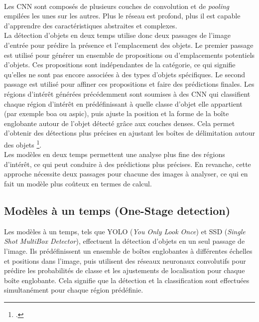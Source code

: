 \documentclass[12pt,twoside]{book}
\begin{document}
\paragraph{}Les CNN sont composés de plusieurs couches de convolution et de \textit{pooling} empilées les unes sur les autres. Plus le réseau est profond, plus il est capable d'apprendre des caractéristiques abstraites et complexes. \\

La détection d'objets en deux temps utilise donc deux passages de l'image d'entrée pour prédire la présence et l'emplacement des objets. Le premier passage est utilisé pour générer un ensemble de propositions ou d'emplacements potentiels d'objets. Ces propositions sont indépendantes de la catégorie, ce qui signifie qu'elles ne sont pas encore associées à des types d'objets spécifiques. Le second passage est utilisé pour affiner ces propositions et faire des prédictions finales. Les régions d'intérêt générées précédemment sont soumises à des CNN qui classifient chaque région d'intérêt en prédéfinissant à quelle classe d'objet elle appartient (par exemple boa ou aspic), puis ajuste la position et la forme de la boîte englobante autour de l'objet détecté grâce aux couches denses. Cela permet d'obtenir des détections plus précises en ajustant les boîtes de délimitation autour des objets \footcite[p. 2-3]{jiao_survey_2019}. \\

Les modèles en deux temps permettent une analyse plus fine des régions d'intérêt, ce qui peut conduire à des prédictions plus précises. En revanche, cette approche nécessite deux passages pour chacune des images à analyser, ce qui en fait un modèle plus coûteux en termes de calcul. 

\newpage

\subsection{Modèles à un temps (One-Stage detection)}

Les modèles à un temps, tels que YOLO (\textit{You Only Look Once}) et SSD (\textit{Single Shot MultiBox Detector}), effectuent la détection d'objets en un seul passage de l’image. Ils prédéfinissent un ensemble de boîtes englobantes à différentes échelles et positions dans l'image, puis utilisent des réseaux neuronaux convolutifs pour prédire les probabilités de classe et les ajustements de localisation pour chaque boîte englobante. Cela signifie que la détection et la classification sont effectuées simultanément pour chaque région prédéfinie. \\
\end{document}
